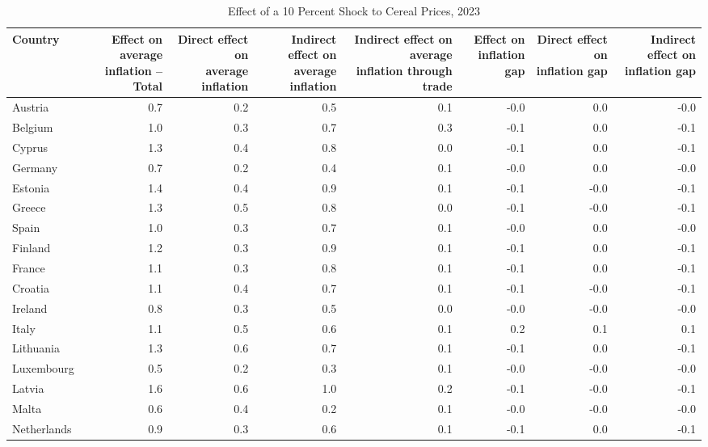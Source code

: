 \documentclass[11pt]{article}
\begin{document}
\setcounter{table}{1}
\begin{table}[H]
\centering
\caption{Effect of a 10 Percent Shock to Cereal Prices, 2023}
\scriptsize
\setlength{\tabcolsep}{1.2pt}
\begin{tabular}{lrrrrrrr}
\toprule
Country & \shortstack{Effect on average\\inflation -- Total} & \shortstack{Direct effect on\\average inflation} & \shortstack{Indirect effect on\\average inflation} & \shortstack{Indirect effect on average\\inflation through trade} & \shortstack{Effect on\\inflation gap} & \shortstack{Direct effect on\\inflation gap} & \shortstack{Indirect effect on\\inflation gap}
 \\
\midrule
Austria & 0.7 & 0.2 & 0.5 & 0.1 & -0.0 & 0.0 & -0.0
 \\
Belgium & 1.0 & 0.3 & 0.7 & 0.3 & -0.1 & 0.0 & -0.1
 \\
Cyprus & 1.3 & 0.4 & 0.8 & 0.0 & -0.1 & 0.0 & -0.1
 \\
Germany & 0.7 & 0.2 & 0.4 & 0.1 & -0.0 & 0.0 & -0.0
 \\
Estonia & 1.4 & 0.4 & 0.9 & 0.1 & -0.1 & -0.0 & -0.1
 \\
Greece & 1.3 & 0.5 & 0.8 & 0.0 & -0.1 & -0.0 & -0.1
 \\
Spain & 1.0 & 0.3 & 0.7 & 0.1 & -0.0 & 0.0 & -0.0
 \\
Finland & 1.2 & 0.3 & 0.9 & 0.1 & -0.1 & 0.0 & -0.1
 \\
France & 1.1 & 0.3 & 0.8 & 0.1 & -0.1 & 0.0 & -0.1
 \\
Croatia & 1.1 & 0.4 & 0.7 & 0.1 & -0.1 & -0.0 & -0.1
 \\
Ireland & 0.8 & 0.3 & 0.5 & 0.0 & -0.0 & -0.0 & -0.0
 \\
Italy & 1.1 & 0.5 & 0.6 & 0.1 & 0.2 & 0.1 & 0.1
 \\
Lithuania & 1.3 & 0.6 & 0.7 & 0.1 & -0.1 & 0.0 & -0.1
 \\
Luxembourg & 0.5 & 0.2 & 0.3 & 0.1 & -0.0 & -0.0 & -0.0
 \\
Latvia & 1.6 & 0.6 & 1.0 & 0.2 & -0.1 & -0.0 & -0.1
 \\
Malta & 0.6 & 0.4 & 0.2 & 0.1 & -0.0 & -0.0 & -0.0
 \\
Netherlands & 0.9 & 0.3 & 0.6 & 0.1 & -0.1 & 0.0 & -0.1
 \\

\end{tabular}
\end{table}
\end{document}
